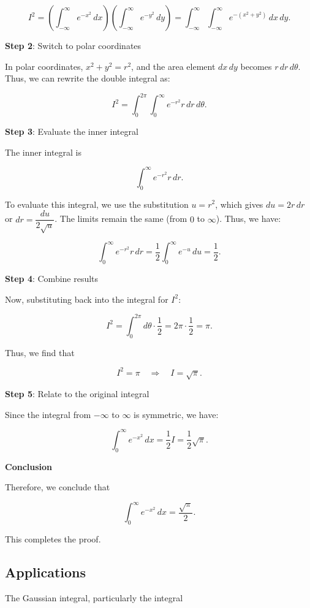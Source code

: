 \documentclass[a4paper,12pt]{book}
\begin{document}
\[
I^2 = \left( \int_{-\infty}^\infty e^{-x^2} \, dx \right) \left( \int_{-\infty}^\infty e^{-y^2} \, dy \right) = \int_{-\infty}^\infty \int_{-\infty}^\infty e^{-(x^2 + y^2)} \, dx \, dy.
\]

\textbf{Step 2}: Switch to polar coordinates

In polar coordinates, \(x^2 + y^2 = r^2\), and the area element \(dx \, dy\) becomes \(r \, dr \, d\theta\). Thus, we can rewrite the double integral as:

\[
I^2 = \int_0^{2\pi} \int_0^\infty e^{-r^2} r \, dr \, d\theta.
\]

\textbf{Step 3}: Evaluate the inner integral

The inner integral is 

\[
\int_0^\infty e^{-r^2} r \, dr.
\]

To evaluate this integral, we use the substitution \(u = r^2\), which gives \(du = 2r \, dr\) or \(dr = \dfrac{du}{2\sqrt{u}}\). The limits remain the same (from \(0\) to \(\infty\)). Thus, we have:

\[
\int_0^\infty e^{-r^2} r \, dr = \dfrac{1}{2} \int_0^\infty e^{-u} \, du = \dfrac{1}{2}.
\]

\textbf{Step 4}: Combine results

Now, substituting back into the integral for \(I^2\):

\[
I^2 = \int_0^{2\pi} d\theta \cdot \dfrac{1}{2} = 2\pi \cdot \dfrac{1}{2} = \pi.
\]

Thus, we find that 

\[
I^2 = \pi \quad \Rightarrow \quad I = \sqrt{\pi}.
\]

\textbf{Step 5}: Relate to the original integral

Since the integral from \(-\infty\) to \(\infty\) is symmetric, we have:

\[
\int_0^\infty e^{-x^2} \, dx = \dfrac{1}{2} I = \dfrac{1}{2} \sqrt{\pi}.
\]

\textbf{Conclusion}

Therefore, we conclude that 

\[
\int_0^\infty e^{-x^2} \, dx = \dfrac{\sqrt{\pi}}{2}.
\] 

This completes the proof.

\subsection{Applications}

The Gaussian integral, particularly the integral
\end{document}
